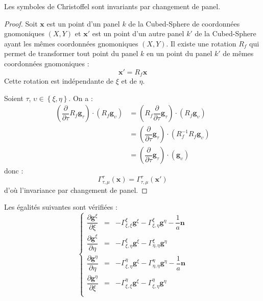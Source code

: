 \begin{proposition}
Les symboles de Christoffel sont invariants par changement de panel.
\end{proposition}

\begin{proof}
Soit $\mathbf{x}$ est un point d'un panel $k$ de la Cubed-Sphere de coordonnées gnomoniques $(X,Y)$ et $\mathbf{x}'$ est un point d'un autre panel $k'$ de la Cubed-Sphere ayant les mêmes coordonnées gnomoniques $(X,Y)$. Il existe une rotation $R_f$ qui permet de transformer tout point du panel $k$ en un point du panel $k'$ de mêmes coordonnées gnomoniques :
\begin{equation}
\mathbf{x}' = R_f \mathbf{x}
\end{equation}
Cette rotation est indépendante de $\xi$ et de $\eta$.

Soient $\tau$, $\upsilon \in \left\lbrace \xi, \eta \right\rbrace$. On a :
\begin{align*}
\left( \dfrac{\partial}{\partial \tau}  R_f \mathbf{g}_{\tau} \right) \cdot \left( R_f \mathbf{g}_{\upsilon} \right) & = \left( R_f \dfrac{\partial}{\partial \tau}   \mathbf{g}_{\tau} \right) \cdot \left( R_f \mathbf{g}_{\upsilon} \right)\\
	& =  \left( \dfrac{\partial}{\partial \tau}  \mathbf{g}_{\tau} \right) \cdot \left( R_f^{-1} R_f \mathbf{g}_{\upsilon} \right)\\
	& =  \left( \dfrac{\partial}{\partial \tau}  \mathbf{g}_{\tau} \right) \cdot \left( \mathbf{g}_{\upsilon} \right)
\end{align*}
donc :
\begin{equation}
\Gamma_{\tau, \mu}^{\tau}(\mathbf{x})=\Gamma_{\tau, \mu}^{\tau}(\mathbf{x}')
\end{equation}
d'où l'invariance par changement de panel.
\end{proof}

\begin{proposition}
\label{prop:christoffel_der}
Les égalités suivantes sont vérifiées :
\begin{equation}
\left\lbrace
\begin{array}{rcl}
\dfrac{\partial \mathbf{g}^{\xi}}{\partial \xi} & = & - \Gamma_{\xi, \xi}^{\xi} \mathbf{g}^{\xi} - \Gamma_{\xi, \eta}^{\xi} \mathbf{g}^{\eta}- \dfrac{1}{a} \mathbf{n}\\

\dfrac{\partial \mathbf{g}^{\xi}}{\partial \eta} & = & - \Gamma_{\xi, \eta}^{\xi} \mathbf{g}^{\xi} - \Gamma_{\eta, \eta}^{\xi} \mathbf{g}^{\eta}\\

\dfrac{\partial \mathbf{g}^{\eta}}{\partial \eta} & = & - \Gamma_{\xi, \eta}^{\eta} \mathbf{g}^{\xi} - \Gamma_{\eta, \eta}^{\eta} \mathbf{g}^{\eta}- \dfrac{1}{a} \mathbf{n}\\

\dfrac{\partial \mathbf{g}^{\eta}}{\partial \xi} & = & - \Gamma_{\xi, \xi}^{\eta} \mathbf{g}^{\xi} - \Gamma_{\xi, \eta}^{\eta} \mathbf{g}^{\eta}\\
\end{array}
\right.
\end{equation}
\end{proposition}

